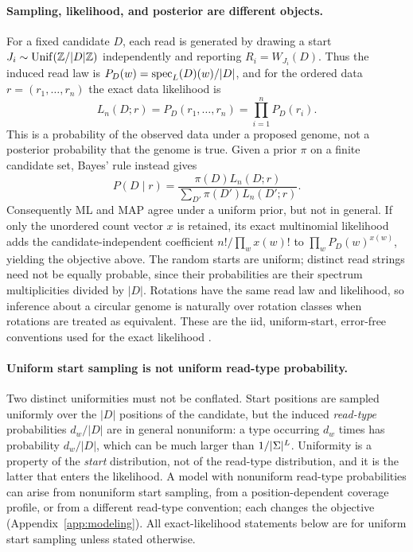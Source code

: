 \paragraph{Sampling, likelihood, and posterior are different objects.}
For a fixed candidate $D$, each read is generated by drawing a start
$J_i\sim\mathrm{Unif}(\mathbb{Z}/|D|\mathbb{Z})$ independently and reporting
$R_i=W_{J_i}(D)$. Thus the induced read law is
$P_D(w)=\operatorname{spec}_L(D)(w)/|D|$, and for the ordered data
$r=(r_1,\ldots,r_n)$ the exact data likelihood is
\[
  L_n(D;r)=P_D(r_1,\ldots,r_n)=\prod_{i=1}^n P_D(r_i).
\]
This is a probability of the observed data under a proposed genome, not a
posterior probability that the genome is true. Given a prior $\pi$ on a finite
candidate set, Bayes' rule instead gives
\[
  P(D\mid r)=\frac{\pi(D)L_n(D;r)}{\sum_{D'}\pi(D')L_n(D';r)}.
\]
Consequently ML and MAP agree under a uniform prior, but not in general. If
only the unordered count vector $x$ is retained, its exact multinomial
likelihood adds the candidate-independent coefficient
$n!/\prod_w x(w)!$ to $\prod_w P_D(w)^{x(w)}$, yielding the objective above.
The random starts are uniform; distinct read strings need not be equally
probable, since their probabilities are their spectrum multiplicities divided
by $|D|$. Rotations have the same read law and likelihood, so inference about a
circular genome is naturally over rotation classes when rotations are treated
as equivalent. These are the iid, uniform-start, error-free conventions used
for the exact likelihood \parencite[\S2, \S6.1]{medvedev2009,shomorony2016}.

\paragraph{Uniform start sampling is not uniform read-type probability.}
Two distinct uniformities must not be conflated. Start positions are sampled
uniformly over the $|D|$ positions of the candidate, but the induced
\emph{read-type} probabilities $d_w/|D|$ are in general nonuniform: a type
occurring $d_w$ times has probability $d_w/|D|$, which can be much larger than
$1/|\Sigma|^L$. Uniformity is a property of the \emph{start} distribution,
not of the read-type distribution, and it is the latter that enters the
likelihood. A model with nonuniform read-type probabilities can arise from
nonuniform start sampling, from a position-dependent coverage profile, or from
a different read-type convention; each changes the objective
(Appendix~\ref{app:modeling}). All exact-likelihood statements below are for
uniform start sampling unless stated otherwise.

